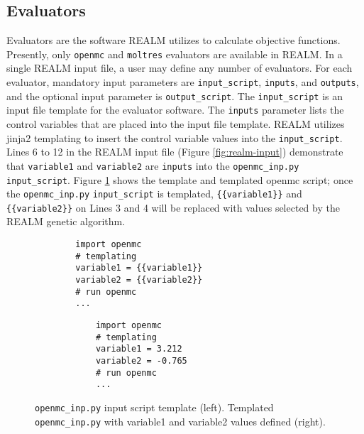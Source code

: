 \subsection{Evaluators}
Evaluators are the software REALM utilizes to calculate objective functions. 
Presently, only \texttt{openmc} and \texttt{moltres} evaluators are available 
in REALM.
In a single REALM input file, a user may define any number of evaluators. 
For each evaluator, mandatory input parameters are \texttt{input\_script}, 
\texttt{inputs}, and \texttt{outputs}, and the optional input parameter is
\texttt{output\_script}. 
The \texttt{input\_script} is an input file template for the evaluator software. 
The \texttt{inputs} parameter lists the control variables that are placed into the 
input file template. 
REALM utilizes jinja2 templating to insert the control variable values into the 
\texttt{input\_script}. 
Lines 6 to 12 in the REALM input file (Figure \ref{fig:realm-input}) demonstrate 
that \texttt{variable1} and \texttt{variable2} are \texttt{inputs} into the 
\texttt{openmc\_inp.py} \texttt{input\_script}. 
Figure \ref{fig:openmcinp.py} shows the template and templated openmc script; 
once the \texttt{openmc\_inp.py} \texttt{input\_script} is templated, 
\texttt{\{\{variable1\}\}} and \texttt{\{\{variable2\}\}}  on Lines 3 and 4 will be 
replaced with values selected by the REALM genetic algorithm. 
\begin{figure}[]
    \begin{minipage}{0.4\textwidth}
        \centering
    \begin{verbatim}
        import openmc 
        # templating 
        variable1 = {{variable1}}
        variable2 = {{variable2}}
        # run openmc 
        ... 
    \end{verbatim}
    \end{minipage}
    \hspace{2cm}
    \begin{minipage}{0.4\textwidth}
        \centering
        \begin{verbatim}
            import openmc 
            # templating 
            variable1 = 3.212
            variable2 = -0.765
            # run openmc 
            ... 
        \end{verbatim}
        \end{minipage}
    \caption{\texttt{openmc\_inp.py} input script template (left). 
             Templated \texttt{openmc\_inp.py} with variable1 and variable2 
             values defined (right).}
    \label{fig:openmcinp.py}
\end{figure}

